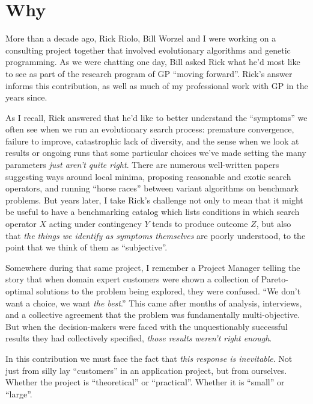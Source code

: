 
\section{Why}\hypertarget{why}{}\label{why}

More than a decade ago, Rick Riolo, Bill Worzel and I were working on a consulting project together that involved evolutionary algorithms and genetic programming. As we were chatting one day, Bill asked Rick what he'd most like to see as part of the research program of GP ``moving forward''. Rick's answer informs this contribution, as well as much of my professional work with GP in the years since.

As I recall, Rick answered that he'd like to better understand the ``symptoms'' we often see when we run an evolutionary search process: premature convergence, failure to improve, catastrophic lack of diversity, and the sense when we look at results or ongoing runs that some particular choices we've made setting the many parameters \emph{just aren't quite right}. There are numerous well-written papers suggesting ways around local minima, proposing reasonable and exotic search operators, and running ``horse races'' between variant algorithms on benchmark problems. But years later, I take Rick's challenge not only to mean that it might be useful to have a benchmarking catalog which lists conditions in which search operator $X$ acting under contingency $Y$ tends to produce outcome $Z$, but also that \emph{the things we identify as symptoms themselves} are poorly understood, to the point that we think of them as ``subjective''.

Somewhere during that same project, I remember a Project Manager telling the story that when domain expert customers were shown a collection of Pareto-optimal solutions to the problem being explored, they were confused. ``We don't want a choice, we want \emph{the best}.'' This came after months of analysis, interviews, and a collective agreement that the problem was fundamentally multi-objective. But when the decision-makers were faced with the unquestionably successful results they had collectively specified, \emph{those results weren't right enough}.

In this contribution we must face the fact that \emph{this response is inevitable}. Not just from silly lay ``customers'' in an application project, but from ourselves. Whether the project is ``theoretical'' or ``practical''. Whether it is ``small'' or ``large''.

